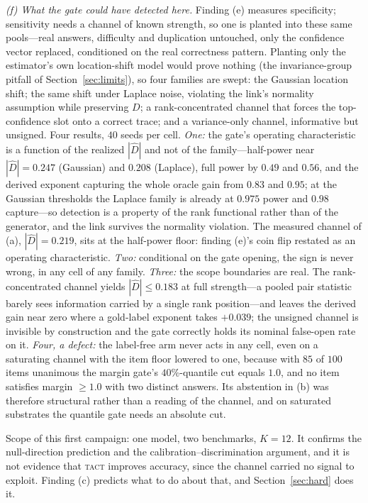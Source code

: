 \documentclass{article}
\newcommand{\Dhat}{\widehat{D}}
\newcommand{\TACT}{\textsc{tact}}
\begin{document}
\emph{(f) What the gate could have detected here.} Finding (e) measures
specificity; sensitivity needs a channel of known strength, so one is planted
into these same pools---real answers, difficulty and duplication untouched,
only the confidence vector replaced, conditioned on the real correctness
pattern. Planting only the estimator's own location-shift model would prove
nothing (the invariance-group pitfall of Section~\ref{sec:limits}), so four
families are swept: the Gaussian location shift; the same shift under Laplace
noise, violating the link's normality assumption while preserving $D$; a
rank-concentrated channel that forces the top-confidence slot onto a correct
trace; and a variance-only channel, informative but unsigned. Four results,
$40$ seeds per cell. \emph{One:} the gate's operating characteristic is a
function of the realized $|\Dhat|$ and not of the family---half-power near
$|\Dhat|=0.247$ (Gaussian) and $0.208$ (Laplace), full power by $0.49$ and
$0.56$, and the derived exponent capturing the whole oracle gain from $0.83$
and $0.95$; at the Gaussian thresholds the Laplace family is already at
$0.975$ power and $0.98$ capture---so detection is a property of the rank
functional rather than of the generator, and the link survives the normality
violation. The measured channel of (a), $|\Dhat|=0.219$, sits at the half-power
floor: finding (e)'s coin flip restated as an operating characteristic.
\emph{Two:} conditional on the gate opening, the sign is never wrong, in any
cell of any family. \emph{Three:} the scope boundaries are real. The
rank-concentrated channel yields $|\Dhat|\le0.183$ at full strength---a pooled
pair statistic barely sees information carried by a single rank position---and
leaves the derived gain near zero where a gold-label exponent takes $+0.039$;
the unsigned channel is invisible by construction and the gate correctly holds
its nominal false-open rate on it. \emph{Four, a defect:} the label-free arm
never acts in any cell, even on a saturating channel with the item floor
lowered to one, because with $85$ of $100$ items unanimous the margin gate's
$40\%$-quantile cut equals $1.0$, and no item satisfies margin $\ge 1.0$ with
two distinct answers. Its abstention in (b) was therefore structural rather
than a reading of the channel, and on saturated substrates the quantile gate
needs an absolute cut.

Scope of this first campaign: one model, two benchmarks, $K{=}12$. It confirms
the null-direction prediction and the calibration--discrimination argument, and
it is not evidence that \TACT{} improves accuracy, since the channel carried no
signal to exploit. Finding (c) predicts what to do about that, and
Section~\ref{sec:hard} does it.
\end{document}
